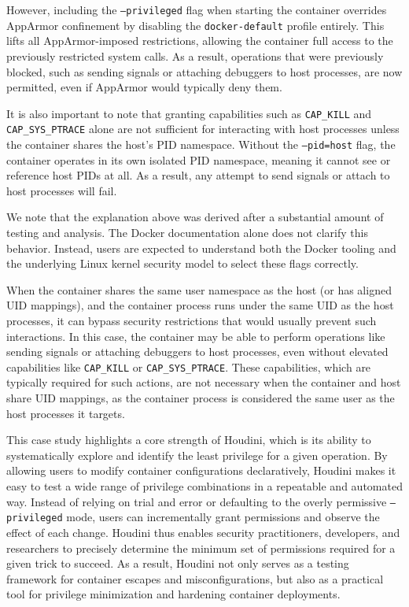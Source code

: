 \documentclass[12pt]{report}
\begin{document}
\begin{doublespace}
However, including the \texttt{--privileged} flag when starting the container overrides AppArmor confinement by disabling the \texttt{docker-default} profile entirely. This lifts all AppArmor-imposed restrictions, allowing the container full access to the previously restricted system calls. As a result, operations that were previously blocked, such as sending signals or attaching debuggers to host processes, are now permitted, even if AppArmor would typically deny them.

It is also important to note that granting capabilities such as \texttt{CAP\_KILL} and \texttt{CAP\_SYS\_PTRACE} alone are not sufficient for interacting with host processes unless the container shares the host’s PID namespace. Without the \texttt{--pid=host} flag, the container operates in its own isolated PID namespace, meaning it cannot see or reference host PIDs at all. As a result, any attempt to send signals or attach to host processes will fail.

We note that the explanation above was derived after a substantial amount of testing and analysis. The Docker documentation alone does not clarify this behavior. Instead, users are expected to understand both the Docker tooling and the underlying Linux kernel security model to select these flags correctly. 

When the container shares the same user namespace as the host (or has aligned UID mappings), and the container process runs under the same UID as the host processes, it can bypass security restrictions that would usually prevent such interactions. In this case, the container may be able to perform operations like sending signals or attaching debuggers to host processes, even without elevated capabilities like \texttt{CAP\_KILL} or \texttt{CAP\_SYS\_PTRACE}. These capabilities, which are typically required for such actions, are not necessary when the container and host share UID mappings, as the container process is considered the same user as the host processes it targets.

This case study highlights a core strength of Houdini, which is its ability to systematically explore and identify the least privilege for a given operation. By allowing users to modify container configurations declaratively, Houdini makes it easy to test a wide range of privilege combinations in a repeatable and automated way. Instead of relying on trial and error or defaulting to the overly permissive \texttt{--privileged} mode, users can incrementally grant permissions and observe the effect of each change. Houdini thus enables security practitioners, developers, and researchers to precisely determine the minimum set of permissions required for a given trick to succeed. As a result, Houdini not only serves as a testing framework for container escapes and misconfigurations, but also as a practical tool for privilege minimization and hardening container deployments.


\end{doublespace}
\end{document}
